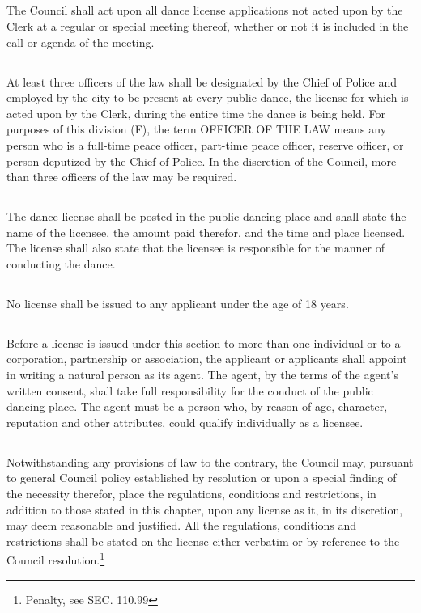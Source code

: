 \subsection{}
The Council shall act upon all dance license applications not acted upon by the Clerk at a regular or special meeting thereof, whether or not it is included in the call or agenda of the meeting.
\subsection{}
At least three officers of the law shall be designated by the Chief of Police and employed by the city to be present at every public dance, the license for which is acted upon by the Clerk, during the entire time the dance is being held.  For purposes of this division (F), the term OFFICER OF THE LAW means any person who is a full-time peace officer, part-time peace officer, reserve officer, or person deputized by the Chief of Police.  In the discretion of the Council, more than three officers of the law may be required.
\subsection{}
The dance license shall be posted in the public dancing place and shall state the name of the licensee, the amount paid therefor, and the time and place licensed.  The license shall also state that the licensee is responsible for the manner of conducting the dance.
\subsection{}
No license shall be issued to any applicant under the age of 18 years.
\subsection{}
Before a license is issued under this section to more than one individual or to a corporation, partnership or association, the applicant or applicants shall appoint in writing a natural person as its agent.  The agent, by the terms of the agent’s written consent, shall take full responsibility for the conduct of the public dancing place.  The agent must be a person who, by reason of age, character, reputation and other attributes, could qualify individually as a licensee.
\subsection{}
Notwithstanding any provisions of law to the contrary, the Council may, pursuant to general Council policy established by resolution or upon a special finding of the necessity therefor, place the regulations, conditions and restrictions, in addition to those stated in this chapter, upon any license as it, in its discretion, may deem reasonable and justified.  All the regulations, conditions and restrictions shall be stated on the license either verbatim or by reference to the Council resolution.\footnote{Penalty, see SEC. 110.99}\\

